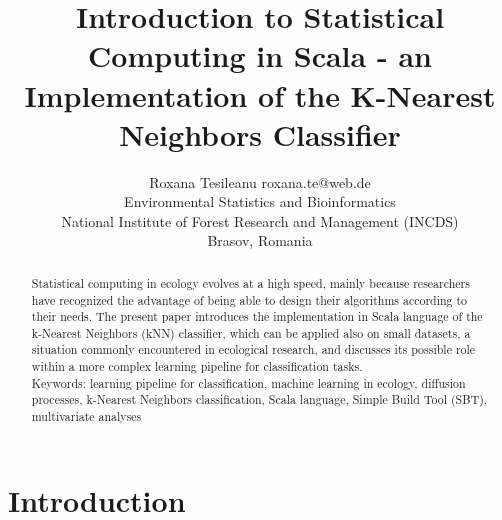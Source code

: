 \documentclass[twoside, 11 p]{article}
\begin{document}



\title{Introduction to Statistical Computing in Scala - an Implementation of the K-Nearest Neighbors Classifier}

\author{\name Roxana Tesileanu \email roxana.te@web.de \\
	\addr Environmental Statistics and Bioinformatics \\
	National Institute of Forest Research and Management (INCDS)\\
	Brasov, Romania}


\maketitle

\begin{abstract}%

 Statistical computing in ecology evolves at a high speed, mainly because researchers have recognized the advantage of being able to design their algorithms according to their needs.
 The present paper introduces the implementation in Scala language of the k-Nearest Neighbors (kNN) classifier, which can be applied also on small datasets, a situation commonly encountered in ecological research, and discusses its possible role within a more complex learning pipeline for classification tasks.\\


Keywords: learning pipeline for classification, machine learning in ecology, diffusion processes,  k-Nearest Neighbors classification, Scala language, Simple Build Tool (SBT), multivariate analyses 
 

\end{abstract}


\section{Introduction}
   
\end{document}
